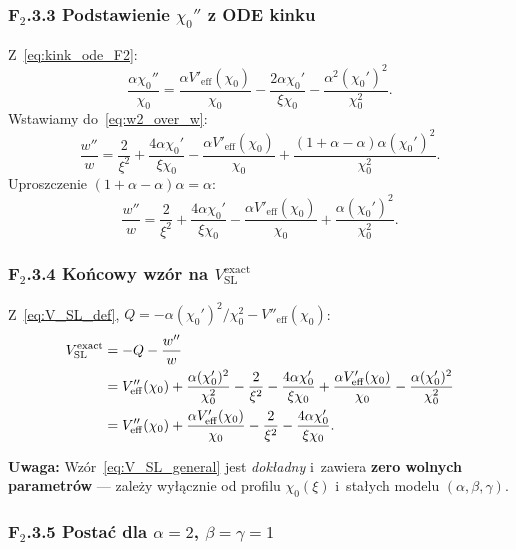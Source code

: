 \subsubsection*{F$_2$.3.3 Podstawienie $\chi_0''$ z ODE kinku}

Z~\eqref{eq:kink_ode_F2}:
\begin{equation}
  \frac{\alpha\chi_0''}{\chi_0}
  = \frac{\alpha V'_\mathrm{eff}(\chi_0)}{\chi_0}
  - \frac{2\alpha\chi_0'}{\xi\chi_0}
  - \frac{\alpha^2(\chi_0')^2}{\chi_0^2}.
  \label{eq:chi0pp_sub}
\end{equation}
Wstawiamy do~\eqref{eq:w2_over_w}:
\begin{equation}
  \frac{w''}{w}
  = \frac{2}{\xi^2}
  + \frac{4\alpha\chi_0'}{\xi\chi_0}
  - \frac{\alpha V'_\mathrm{eff}(\chi_0)}{\chi_0}
  + \frac{(1+\alpha-\alpha)\alpha(\chi_0')^2}{\chi_0^2}.
\end{equation}
Uproszczenie $(1+\alpha-\alpha)\alpha = \alpha$:
\begin{equation}
  \frac{w''}{w}
  = \frac{2}{\xi^2}
  + \frac{4\alpha\chi_0'}{\xi\chi_0}
  - \frac{\alpha V'_\mathrm{eff}(\chi_0)}{\chi_0}
  + \frac{\alpha(\chi_0')^2}{\chi_0^2}.
  \label{eq:w2_over_w_final}
\end{equation}

\subsubsection*{F$_2$.3.4 Końcowy wzór na $V_\mathrm{SL}^\mathrm{exact}$}

Z~\eqref{eq:V_SL_def}, $Q = -\alpha(\chi_0')^2/\chi_0^2 - V''_\mathrm{eff}(\chi_0)$:
\begin{align}
  V_\mathrm{SL}^\mathrm{exact}
  &= -Q - \frac{w''}{w}
  \notag\\
  &= V''_\mathrm{eff}(\chi_0) + \frac{\alpha(\chi_0')^2}{\chi_0^2}
  - \frac{2}{\xi^2} - \frac{4\alpha\chi_0'}{\xi\chi_0}
  + \frac{\alpha V'_\mathrm{eff}(\chi_0)}{\chi_0}
  - \frac{\alpha(\chi_0')^2}{\chi_0^2}
  \notag\\
  &= V''_\mathrm{eff}(\chi_0)
  + \frac{\alpha V'_\mathrm{eff}(\chi_0)}{\chi_0}
  - \frac{2}{\xi^2}
  - \frac{4\alpha\chi_0'}{\xi\chi_0}.
  \label{eq:V_SL_general}
\end{align}

\textbf{Uwaga:} Wzór~\eqref{eq:V_SL_general} jest \emph{dokładny}
i~zawiera \textbf{zero wolnych parametrów} — zależy wyłącznie
od profilu $\chi_0(\xi)$ i~stałych modelu $(\alpha, \beta, \gamma)$.

\subsubsection*{F$_2$.3.5 Postać dla $\alpha=2$, $\beta=\gamma=1$}

